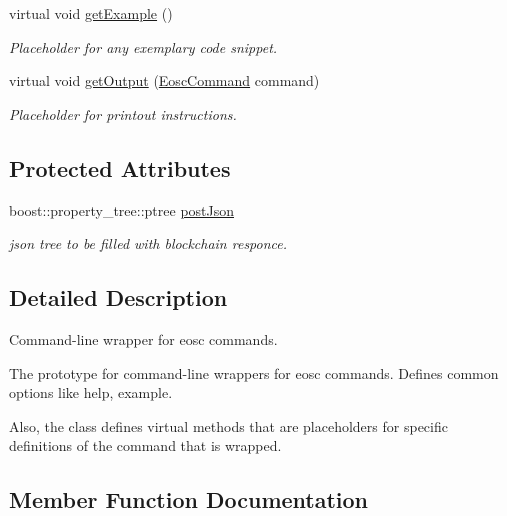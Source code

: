 \begin{DoxyCompactItemize}
virtual void \hyperlink{classtokenika_1_1eosc_1_1_command_options_ab1fe134b6c2230257a5c07b021812986}{get\+Example} ()
\begin{DoxyCompactList}\small\item\em Placeholder for any exemplary code snippet. \end{DoxyCompactList}\item 
virtual void \hyperlink{classtokenika_1_1eosc_1_1_command_options_a346dcfb00b8ac522169714544bfa7be0}{get\+Output} (\hyperlink{classtokenika_1_1eosc_1_1_eosc_command}{Eosc\+Command} command)
\begin{DoxyCompactList}\small\item\em Placeholder for printout instructions. \end{DoxyCompactList}\end{DoxyCompactItemize}
\subsection*{Protected Attributes}
\begin{DoxyCompactItemize}
\item 
\mbox{\label{classtokenika_1_1eosc_1_1_command_options_a626e842c89d8332090886bc53fbad616}} 
boost\+::property\+\_\+tree\+::ptree \hyperlink{classtokenika_1_1eosc_1_1_command_options_a626e842c89d8332090886bc53fbad616}{post\+Json}
\begin{DoxyCompactList}\small\item\em json tree to be filled with blockchain responce. \end{DoxyCompactList}\end{DoxyCompactItemize}


\subsection{Detailed Description}
Command-\/line wrapper for eosc commands. 

The prototype for command-\/line wrappers for eosc commands. Defines common options like \textquotesingle{}help\textquotesingle{}, \textquotesingle{}example\textquotesingle{}.

Also, the class defines virtual methods that are placeholders for specific definitions of the command that is wrapped. 

\subsection{Member Function Documentation}
\mbox{\label{classtokenika_1_1eosc_1_1_command_options_a787f15164e2055394d9d948c07bf201c}} 
